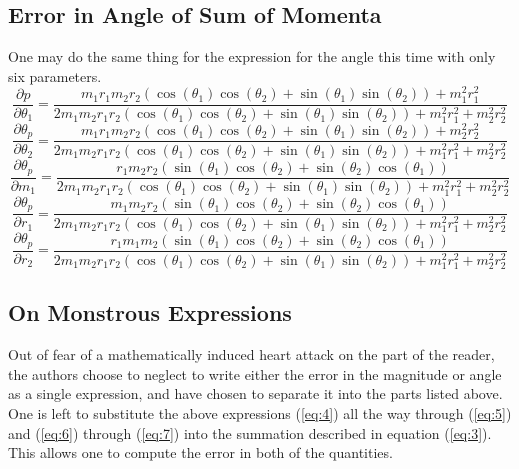 \documentclass[11pt]{article}
\begin{document}
\subsection{Error in Angle of Sum of Momenta}
One may do the same thing for the expression for the angle this time with only six parameters.
\begin{equation}
\frac{\partial p}{ \partial \theta_1} = \frac {m_1 r_1 m_2 r_2 \left(\cos(\theta_1)\cos(\theta_2) + \sin(\theta_1)\sin(\theta_2) \right) + m_1^2 r_1^2}{2 m_1 m_2 r_1 r_2 \left(\cos(\theta_1)\cos(\theta_2) + \sin(\theta_1)\sin(\theta_2) \right) + m_1^2 r_1^2 + m_2^2 r_2^2} \label{eq:6}
\end{equation}
\begin{equation}
\frac{\partial \theta_p}{ \partial \theta_2} = \frac {m_1 r_1 m_2 r_2 \left(\cos(\theta_1)\cos(\theta_2) + \sin(\theta_1)\sin(\theta_2) \right) + m_2^2 r_2^2}{2 m_1 m_2 r_1 r_2 \left(\cos(\theta_1)\cos(\theta_2) + \sin(\theta_1)\sin(\theta_2) \right) + m_1^2 r_1^2 + m_2^2 r_2^2}
\end{equation}
\begin{equation}
\frac{\partial \theta_p}{ \partial m_1} = \frac {r_1 m_2 r_2 \left( \sin (\theta_1) \cos(\theta_2) + \sin (\theta_2) \cos(\theta_1) \right)}{2 m_1 m_2 r_1 r_2 \left(\cos(\theta_1)\cos(\theta_2) + \sin(\theta_1)\sin(\theta_2) \right) + m_1^2 r_1^2 + m_2^2 r_2^2}
\end{equation}
\begin{equation}
\frac{\partial \theta_p}{ \partial r_1} = \frac {m_1 m_2 r_2 \left( \sin (\theta_1) \cos(\theta_2) + \sin (\theta_2) \cos(\theta_1) \right)}{2 m_1 m_2 r_1 r_2 \left(\cos(\theta_1)\cos(\theta_2) + \sin(\theta_1)\sin(\theta_2) \right) + m_1^2 r_1^2 + m_2^2 r_2^2}
\end{equation}
\begin{equation}
\frac{\partial \theta_p}{ \partial r_2} = \frac {r_1 m_1 m_2 \left( \sin (\theta_1) \cos(\theta_2) + \sin (\theta_2) \cos(\theta_1) \right)}{2 m_1 m_2 r_1 r_2 \left(\cos(\theta_1)\cos(\theta_2) + \sin(\theta_1)\sin(\theta_2) \right) + m_1^2 r_1^2 + m_2^2 r_2^2} \label{eq:7}
\end{equation}
\subsection{On Monstrous Expressions}
Out of fear of a mathematically induced heart attack on the part of the reader, the authors choose to neglect to write either the error in the magnitude or angle as a single expression, and have chosen to separate it into the parts listed above. One is left to substitute the above expressions (\ref{eq:4}) all the way through (\ref{eq:5}) and (\ref{eq:6}) through (\ref{eq:7}) into the summation described in equation (\ref{eq:3}). This allows one to compute the error in both of the quantities.
\end{document}
